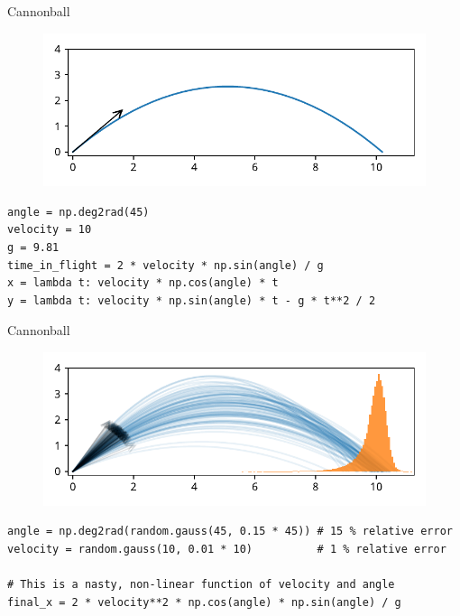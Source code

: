 \documentclass[12pt, aspectratio=149]{beamer}
\theoremstyle{plain}
\begin{document}
\begin{frame}[fragile]{Cannonball}
\vspace*{-1em}
\begin{center}
 \begin{figure}
    	\centering
    	\includegraphics[width=0.99\linewidth]{figures/cannonball}
 \end{figure}
 \end{center}
 \vspace*{-2em}

\begin{center}
\begin{verbatim} 
angle = np.deg2rad(45)
velocity = 10
g = 9.81
time_in_flight = 2 * velocity * np.sin(angle) / g
x = lambda t: velocity * np.cos(angle) * t
y = lambda t: velocity * np.sin(angle) * t - g * t**2 / 2
\end{verbatim}
\end{center}
\end{frame}

\begin{frame}[fragile]{Cannonball}
\vspace*{-1em}
\begin{center}
 \begin{figure}
    	\centering
    	\includegraphics[width=0.99\linewidth]{figures/cannonball_sim1}
 \end{figure}
 \end{center}
 \vspace*{-2em}

\begin{center}
\begin{verbatim} 
angle = np.deg2rad(random.gauss(45, 0.15 * 45)) # 15 % relative error
velocity = random.gauss(10, 0.01 * 10)          # 1 % relative error

# This is a nasty, non-linear function of velocity and angle
final_x = 2 * velocity**2 * np.cos(angle) * np.sin(angle) / g
\end{verbatim}
\end{center}
\end{frame}
\end{document}
